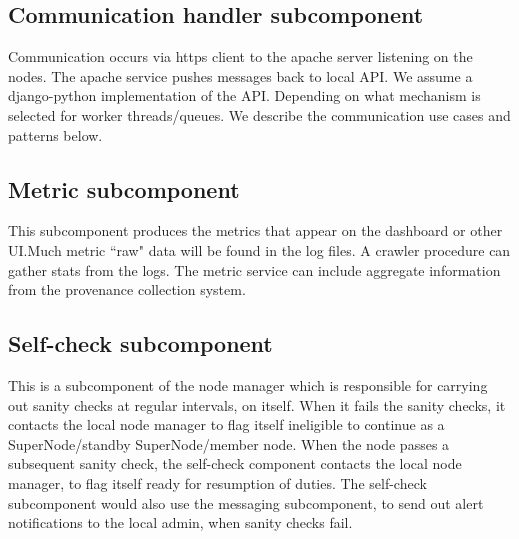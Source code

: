 \documentclass[oneside,12pt]{memoir}
\begin{document}
\begin{enumerate}

\end{enumerate}

\subsection{Communication handler subcomponent}
Communication occurs via https client to the apache server listening on the nodes.   The apache service pushes messages back to local API.   We assume a django-python implementation of the API.  Depending on what mechanism is selected for worker threads/queues.
 We describe the communication use cases and patterns below.  


\subsection{Metric subcomponent}

This subcomponent produces the metrics that appear on the dashboard or other UI.Much metric ``raw" data will be found in the log files.  A crawler procedure can gather stats from the logs.   The metric service can include aggregate information from the provenance collection system. 

\subsection{Self-check subcomponent}
This is a subcomponent of the node manager which is responsible for carrying out sanity checks at regular intervals, on itself. When it fails the sanity checks, it contacts the local node manager to flag itself ineligible to continue as a SuperNode/standby SuperNode/member node. When the node passes a subsequent sanity check, the self-check component contacts the local node manager, to flag itself ready for resumption of duties.  The self-check subcomponent would also use the messaging subcomponent, to send out alert notifications to the local admin, when sanity checks fail.
\end{document}
